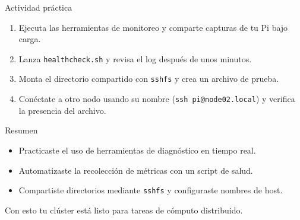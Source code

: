 \documentclass[aspectratio=169,professionalfonts]{beamer}
\begin{document}
\begin{frame}[fragile]{Actividad práctica}
  \begin{enumerate}
    \item Ejecuta las herramientas de monitoreo y comparte capturas de tu Pi bajo carga.
    \item Lanza \texttt{healthcheck.sh} y revisa el log después de unos minutos.
    \item Monta el directorio compartido con \texttt{sshfs} y crea un archivo de prueba.
    \item Conéctate a otro nodo usando su nombre (\texttt{ssh pi@node02.local}) y verifica la presencia del archivo.
  \end{enumerate}
\end{frame}

\begin{frame}[fragile]{Resumen}
  \begin{itemize}
    \item Practicaste el uso de herramientas de diagnóstico en tiempo real.
    \item Automatizaste la recolección de métricas con un script de salud.
    \item Compartiste directorios mediante \texttt{sshfs} y configuraste nombres de host.
  \end{itemize}
  \vspace{0.5em}
  Con esto tu clúster está listo para tareas de cómputo distribuido.
\end{frame}
\end{document}
